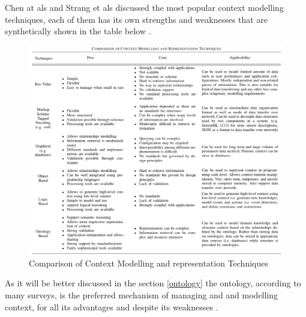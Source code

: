 \documentclass{thesisreport}
\begin{document}
 Chen at als \cite{chen2000survey} and Strang et als \cite{strang2004context} discussed the most popular context modelling techniques, each of them has its own strengths and weaknesses that are synthetically shown in the table below \cite{perera2014context}.
 
 	\begin{figure}[H]
		\centering
		\includegraphics[width=17.5cm]{Thesis/data/ContextModelComparison.png}
		\caption{Comparison of Context Modelling and representation Techniques \cite{perera2014context}}
		\label{fig:populationProspect}
	\end{figure}
 As it will be better discussed in the section \ref{ontology} the ontology, according to many surveys, is the preferred mechanism of managing and and modelling context, for all its advantages and despite its weaknesses \cite{perera2014context}.
 
 
\end{document}

